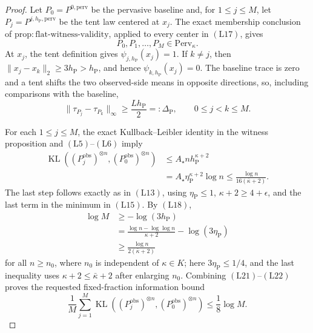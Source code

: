 \documentclass{article}
\begin{document}
\begin{proof}
Let \(P_0=P^{0,\mathrm{perv}}\) be the pervasive baseline and, for
\(1\leq j\leq M\), let \(P_j=P^{j,h_{\mathrm P},\mathrm{perv}}\) be the tent law centered at \(x_j\).  The exact membership conclusion of
\(\mathrm{prop{:}flat\text{-}witness\text{-}validity}\), applied to every center in \((\mathrm{L17})\), gives
\[
 P_0,P_1,\ldots,P_M\in\mathrm{Perv}_\kappa.
 \tag{L19}
\]
At \(x_j\), the tent definition gives \(\psi_{j,h_{\mathrm P}}(x_j)=1\).  If \(k\ne j\), then \(\|x_j-x_k\|_2\geq3h_{\mathrm P}>h_{\mathrm P}\), and hence \(\psi_{k,h_{\mathrm P}}(x_j)=0\).  The baseline trace is zero and a tent shifts the two observed-side means in opposite directions, so, including comparisons with the baseline,
\[
 \|\tau_{P_j}-\tau_{P_k}\|_\infty
 \geq\frac{Lh_{\mathrm P}}2=:\Delta_{\mathrm P},
 \qquad 0\leq j<k\leq M.
 \tag{L20}
\]

For each \(1\leq j\leq M\), the exact Kullback--Leibler identity in the witness proposition and \((\mathrm{L5})\)--\((\mathrm{L6})\) imply
\[
\begin{aligned}
 \operatorname{KL}\!\left((P_j^{\mathrm{obs}})^{\otimes n},
 (P_0^{\mathrm{obs}})^{\otimes n}\right)
 &\leq A_\star n h_{\mathrm P}^{\kappa+2}\\
 &=A_\star\eta_{\mathrm P}^{\kappa+2}\log n
 \leq\frac{\log n}{16(\bar\kappa+2)}.
\end{aligned}
 \tag{L21}
\]
The last step follows exactly as in \((\mathrm{L13})\), using
\(\eta_{\mathrm P}\leq1\), \(\kappa+2\geq4+\epsilon\), and the last term in the minimum in \((\mathrm{L15})\).
By \((\mathrm{L18})\),
\[
\begin{aligned}
 \log M
 &\geq -\log(3h_{\mathrm P})\\
 &=\frac{\log n-\log\log n}{\kappa+2}
   -\log(3\eta_{\mathrm P})\\
 &\geq\frac{\log n}{2(\bar\kappa+2)}
\end{aligned}
 \tag{L22}
\]
for all \(n\geq n_0\), where \(n_0\) is independent of \(\kappa\in K\); here \(3\eta_{\mathrm P}\leq1/4\), and the last inequality uses \(\kappa+2\leq\bar\kappa+2\) after enlarging \(n_0\).  Combining \((\mathrm{L21})\)--\((\mathrm{L22})\) proves the requested fixed-fraction information bound
\[
 \frac1M\sum_{j=1}^M
 \operatorname{KL}\!\left((P_j^{\mathrm{obs}})^{\otimes n},
 (P_0^{\mathrm{obs}})^{\otimes n}\right)
 \leq\frac18\log M.
 \tag{L23}
\]


\end{proof}
\end{document}
